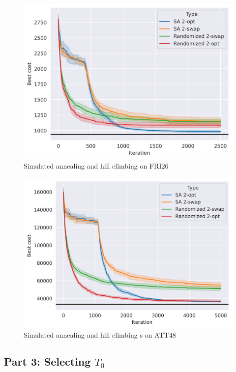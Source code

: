 \begin{figure}
    \centering
    \includegraphics[]{images/fri26-with-hc.png}
    \caption{Simulated annealing and hill climbing on FRI26}
    \label{fig:fri26}
\end{figure}

\begin{figure}
    \centering
    \includegraphics[]{images/att48-with-hc.png}
    \caption{Simulated annealing and hill climbing s on ATT48}
    \label{fig:att48}
\end{figure}

\subsection*{Part 3: Selecting \(T_0\)}
